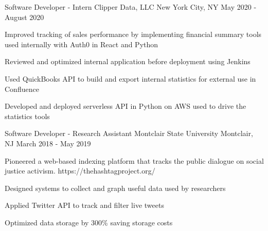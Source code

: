 

\begin{cventries}

  \cventry
    {Software Developer - Intern} %
    {Clipper Data, LLC} %
    {New York City, NY} %
    {May 2020 - August 2020} %
    {
      \begin{cvitems} %
        \item {Improved tracking of sales performance by implementing financial summary tools used internally with Auth0 in React and Python}
        \item {Reviewed and optimized internal application before deployment using Jenkins}
        \item {Used QuickBooks API to build and export internal statistics for external use in Confluence}
        \item {Developed and deployed serverless API in Python on AWS used to drive the statistics tools}
      \end{cvitems}
    }
  \cventry
    {Software Developer - Research Assistant} %
    {Montclair State University} %
    {Montclair, NJ} %
    {March 2018 - May 2019} %
    {
      \begin{cvitems} %
        \item Pioneered a web-based indexing platform that tracks the public dialogue on social justice activism. https://thehashtagproject.org/
        \item Designed systems to collect and graph useful data used by researchers
        \item Applied Twitter API to track and filter live tweets
        \item Optimized data storage by 300\% saving storage costs
      \end{cvitems}
    }
\end{cventries}
